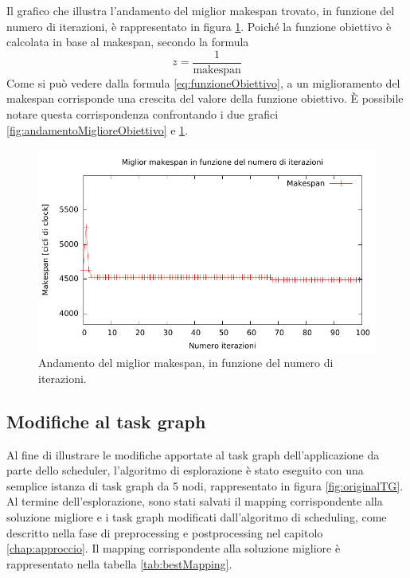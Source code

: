 Il grafico che illustra l'andamento del miglior makespan trovato, in funzione del numero
di iterazioni, \`e rappresentato in figura \ref{fig:andamentoMigliorMakespan}.
Poich\'e la funzione obiettivo \`e calcolata in base al makespan, secondo la formula
\begin{equation} \label{eq:funzioneObiettivo}
 z = \frac{1}{\text{makespan}}
\end{equation}
Come si pu\`o vedere dalla formula \ref{eq:funzioneObiettivo}, a un miglioramento del makespan
corrisponde una crescita del valore della funzione obiettivo.
\`E possibile notare questa corrispondenza confrontando i due grafici \ref{fig:andamentoMiglioreObiettivo}
e \ref{fig:andamentoMigliorMakespan}.

\begin{figure}[tb]
 \begin{center}
  \includegraphics[width=\textwidth]{./capitoli/figure/cap6/bestClock.pdf}
  \caption{Andamento del miglior makespan, in funzione del numero
  di iterazioni.}
  \label{fig:andamentoMigliorMakespan}
 \end{center}
\end{figure}

\subsection{Modifiche al task graph}
\label{subsec:modificheTaskGraph}
Al fine di illustrare le modifiche apportate al task graph dell'applicazione
da parte dello scheduler, l'algoritmo di esplorazione \`e stato eseguito con una semplice istanza
di task graph da 5 nodi, rappresentato in figura \ref{fig:originalTG}.
Al termine dell'esplorazione, sono stati salvati il mapping corrispondente alla soluzione
migliore e i task graph modificati dall'algoritmo di scheduling, come descritto nella
fase di preprocessing e postprocessing nel capitolo \ref{chap:approccio}.
Il mapping corrispondente alla soluzione migliore \`e rappresentato nella tabella
\ref{tab:bestMapping}.

